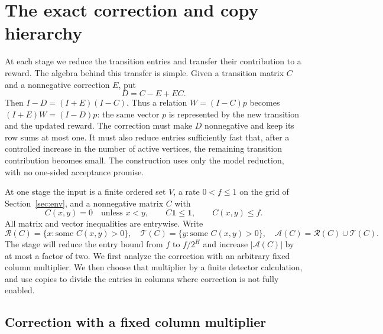 \section{The exact correction and copy hierarchy}
\label{sec:hierarchy}

At each stage we reduce the transition entries and transfer their
contribution to a reward.  The algebra behind this transfer is simple. Given a transition
matrix $C$ and a nonnegative correction $E$, put
\[
 D=C-E+EC.
\]
Then $I-D=(I+E)(I-C)$. Thus a relation $W=(I-C)p$ becomes
$(I+E)W=(I-D)p$: the same vector $p$ is represented by the new transition
and the updated reward. The correction must make $D$ nonnegative and keep
its row sums at most one. It must also reduce entries sufficiently fast
that, after a controlled increase in the number of active vertices, the
remaining transition contribution becomes small.  The construction uses
only the model reduction, with no one-sided acceptance promise.

At one stage the input is a finite ordered set $V$, a rate $0<f\le1$
on the grid of Section~\ref{sec:env}, and a nonnegative matrix $C$ with
\begin{equation}
 C(x,y)=0\quad\text{unless }x<y,\qquad
 C\mathbf1\le\mathbf1,\qquad C(x,y)\le f.
 \label{eq:hier-input}
\end{equation}
All matrix and vector inequalities are entrywise. Write
\[
 \mathcal R(C)=\{x:\text{some }C(x,y)>0\},\quad
 \mathcal T(C)=\{y:\text{some }C(x,y)>0\},\quad
 \mathcal A(C)=\mathcal R(C)\cup\mathcal T(C).
\]
The stage will reduce the entry bound from $f$ to $f/2^H$ and increase
$|\mathcal A(C)|$ by at most a factor of two. We first analyze the
correction with an arbitrary fixed column multiplier. We then choose that
multiplier by a finite detector calculation, and use copies to divide the
entries in columns where correction is not fully enabled.

\subsection{Correction with a fixed column multiplier}

